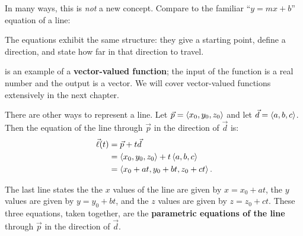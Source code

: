 In many ways, this is \emph{not} a new concept. Compare  to the familiar ``$y=mx+b$'' equation of a line:
\begin{center}
\captionsetup{type=figure}%
\caption{Understanding the vector equation of a line.}
\label{fig:lines_eq}\tagstructend
\end{center}

The equations exhibit the same structure: they give a starting point, define a direction, and state how far in that direction to travel.

 is an example of a \textbf{vector-valued function}; the input of the function is a real number and the output is a vector. We will cover vector-valued functions extensively in the next chapter.

There are other ways to represent a line. Let $\vec p =\left\langle x_0,y_0,z_0\right\rangle$ and let $\vec d =\left\langle a,b,c\right\rangle$. Then the equation of the line through $\vec p$ in the direction of $\vec d$ is:
\begin{align*}
\vec\ell(t) &= \vec p + t\vec d \\
						&=\left\langle x_0,y_0,z_0\right\rangle+ t\left\langle a,b,c\right\rangle\\
						&=\left\langle x_0 + at, y_0+bt, z_0+ct\right\rangle.
\end{align*}

The last line states the the $x$ values of the line are given by $x=x_0+at$, the $y$ values are given by $y = y_0+bt$, and the $z$ values are given by $z = z_0 + ct$. These three equations, taken together, are the \textbf{parametric equations of the line} through $\vec p$ in the direction of $\vec d$.

